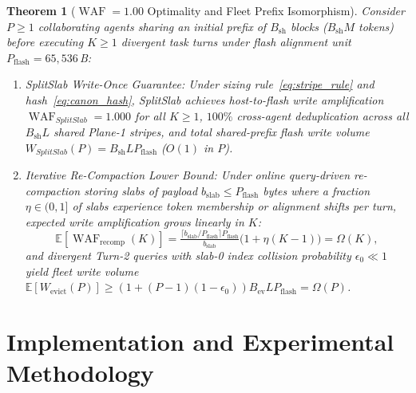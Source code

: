\documentclass[final,5p,times,twocolumn]{elsarticle}
\newtheorem{theorem}{Theorem}
\theoremstyle{definition}
\theoremstyle{remark}
\newcommand{\SplitSlab}{\textup{\textsc{SplitSlab}}}
\newcommand{\WAF}{\operatorname{WAF}}
\newcommand{\E}{\mathbb{E}}
\def\SplitSlab{SplitSlab}%
\begin{document}
\begin{theorem}[$\WAF = 1.00$ Optimality and Fleet Prefix Isomorphism]\label{thm:waf}
Consider $P \ge 1$ collaborating agents sharing an initial prefix of $B_{\mathrm{sh}}$ blocks ($B_{\mathrm{sh}} M$ tokens) before executing $K \ge 1$ divergent task turns under flash alignment unit $P_{\mathrm{flash}} = 65{,}536$\,B:
\begin{enumerate}
  \item \emph{\SplitSlab{} Write-Once Guarantee:} Under sizing rule~\eqref{eq:stripe_rule} and hash~\eqref{eq:canon_hash}, \SplitSlab{} achieves host-to-flash write amplification $\WAF_{\SplitSlab} = 1.000$ for all $K \ge 1$, $100\%$ cross-agent deduplication across all $B_{\mathrm{sh}} L$ shared Plane-1 stripes, and total shared-prefix flash write volume $W_{\SplitSlab}(P) = B_{\mathrm{sh}} L P_{\mathrm{flash}}$ ($O(1)$ in $P$).
  \item \emph{Iterative Re-Compaction Lower Bound:} Under online query-driven re-compaction storing slabs of payload $b_{\mathrm{slab}} \le P_{\mathrm{flash}}$ bytes where a fraction $\eta \in (0,1]$ of slabs experience token membership or alignment shifts per turn, expected write amplification grows linearly in $K$:
  \begin{equation}\label{eq:thm2_waf}
  \E[\WAF_{\mathrm{recomp}}(K)] = \tfrac{\lceil b_{\mathrm{slab}}/P_{\mathrm{flash}}\rceil P_{\mathrm{flash}}}{b_{\mathrm{slab}}}\big(1{+}\eta(K{-}1)\big) = \Omega(K),
  \end{equation}
  and divergent Turn-2 queries with slab-0 index collision probability $\epsilon_0 \ll 1$ yield fleet write volume $\E[W_{\mathrm{evict}}(P)] \ge (1 + (P-1)(1-\epsilon_0)) B_{\mathrm{ev}} L P_{\mathrm{flash}} = \Omega(P)$.
\end{enumerate}
\end{theorem}

\section{Implementation and Experimental Methodology}\label{sec:methodology}
\end{document}
